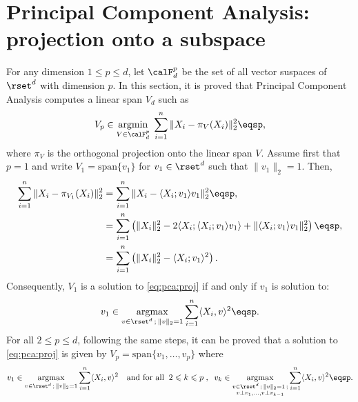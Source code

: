 \section{Principal Component Analysis: projection onto a subspace}
 For any dimension $1\leqslant p \leqslant  d$, let $\calF_d^p$ be the set of all vector suspaces of $\rset^d$ with dimension $p$. In this section, it is proved that  Principal Component Analysis computes a linear span $V_d$ such as
\begin{align}
\label{eq:pca:proj}
V_p \in \underset{V\in \calF_d^p}{\mathrm{argmin}} \;\sum_{i=1}^n\|X_i - \pi_V(X_i)\|_2^2\eqsp, 
\end{align}
where $\pi_V$ is the orthogonal projection onto the linear span $V$.
Assume first that $p = 1$ and write $V_1 = \mathrm{span}\{v_1\}$ for $v_1\in \rset^d$ such that $\|v_1\|_2 = 1$. Then, 
\begin{align*}
\sum_{i=1}^n\|X_i - \pi_{V_1}(X_i)\|_2^2 & = \sum_{i=1}^n\|X_i -  \langle X_i; v_1 \rangle v_1 \|_2^2\eqsp,\\
& = \sum_{i=1}^n \left( \|X_i\|_2^2 - 2 \langle X_i; \langle X_i; v_1 \rangle v_1 \rangle + \| \langle X_i; v_1 \rangle v_1 \|_2^2 \right)\eqsp,\\
& = \sum_{i=1}^n \left( \|X_i\|_2^2 -   \langle X_i; v_1 \rangle^2 \right).
\end{align*}
Consequently, $V_1$ is a solution to \eqref{eq:pca:proj} if and only if $v_1$ is solution to:
\[
v_1 \in \underset{v \in \rset^d\,;\, \|v\|_2=1}{\mathrm{argmax}} \sum_{i=1}^n   \langle X_i, v \rangle^2\eqsp.
\]
For all $2\leqslant p \leqslant d$, following the same steps, it can be proved that  a solution to \eqref{eq:pca:proj} is given by $V_p = \mathrm{span}\{v_1, \ldots, v_p\}$ where
\begin{equation}
\label{eq:vecpca}
v_1 \in \underset{v\in \rset^d\,;\,\|v\|_2=1}{\mathrm{argmax}} \sum_{i=1}^n\langle X_i,v\rangle^2 \quad\mbox{and for all}\;\; 2\leqslant k \leqslant p\;,\;\; v_k \in \underset{\substack{v\in \rset^d\,;\,\|v\|_2=1\,;\\ v\perp v_1,\ldots,v\perp v_{k-1}}}{\mathrm{argmax}}\sum_{i=1}^n\langle X_i,v\rangle^2\eqsp. 
\end{equation}
